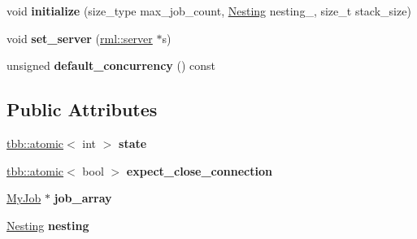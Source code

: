 \begin{DoxyCompactItemize}
\item 
\hypertarget{classClientBase_aef944515ea6728b68d51cf13dd69666d}{}void {\bfseries initialize} (size\+\_\+type max\+\_\+job\+\_\+count, \hyperlink{structNesting}{Nesting} nesting\+\_\+, size\+\_\+t stack\+\_\+size)\label{classClientBase_aef944515ea6728b68d51cf13dd69666d}

\item 
\hypertarget{classClientBase_a5eff33ac6ad0b9f068a60b5668a6176e}{}void {\bfseries set\+\_\+server} (\hyperlink{classrml_1_1server}{rml\+::server} $\ast$s)\label{classClientBase_a5eff33ac6ad0b9f068a60b5668a6176e}

\item 
\hypertarget{classClientBase_a2c294d02e1660b87748d8891d8123a29}{}unsigned {\bfseries default\+\_\+concurrency} () const \label{classClientBase_a2c294d02e1660b87748d8891d8123a29}

\end{DoxyCompactItemize}
\subsection*{Public Attributes}
\begin{DoxyCompactItemize}
\item 
\hypertarget{classClientBase_a6a94fd44794b13d5e42d310d079b2c4c}{}\hyperlink{structtbb_1_1atomic}{tbb\+::atomic}$<$ int $>$ {\bfseries state}\label{classClientBase_a6a94fd44794b13d5e42d310d079b2c4c}

\item 
\hypertarget{classClientBase_a882393e6903dcbf72465a445973183e4}{}\hyperlink{structtbb_1_1atomic}{tbb\+::atomic}$<$ bool $>$ {\bfseries expect\+\_\+close\+\_\+connection}\label{classClientBase_a882393e6903dcbf72465a445973183e4}

\item 
\hypertarget{classClientBase_aec9598b61d4c7e4ee929227cbabe4636}{}\hyperlink{classMyJob}{My\+Job} $\ast$ {\bfseries job\+\_\+array}\label{classClientBase_aec9598b61d4c7e4ee929227cbabe4636}

\item 
\hypertarget{classClientBase_a4f99c8dd680d36b05caf49f8c5db0461}{}\hyperlink{structNesting}{Nesting} {\bfseries nesting}\label{classClientBase_a4f99c8dd680d36b05caf49f8c5db0461}

\end{DoxyCompactItemize}

